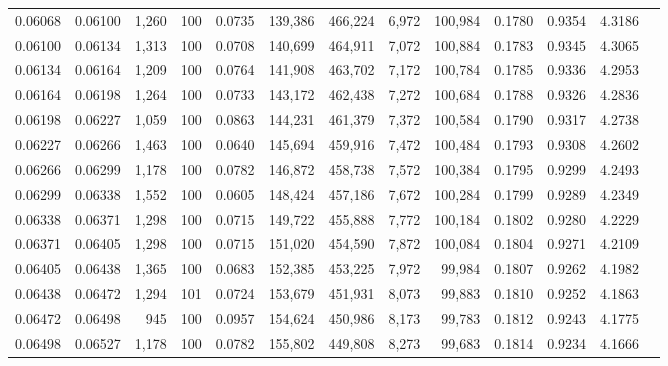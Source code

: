 \begin{tabular}{rrrrrrrrrrrrr}
0.06068 & 0.06100 & 1,260 & 100 &                                     0.0735 & 139,386 & 466,224 &   6,972 & 100,984 & 0.1780 & 0.9354 & 4.3186 \\
0.06100 & 0.06134 & 1,313 & 100 &                                     0.0708 & 140,699 & 464,911 &   7,072 & 100,884 & 0.1783 & 0.9345 & 4.3065 \\
0.06134 & 0.06164 & 1,209 & 100 &                                     0.0764 & 141,908 & 463,702 &   7,172 & 100,784 & 0.1785 & 0.9336 & 4.2953 \\
0.06164 & 0.06198 & 1,264 & 100 &                                     0.0733 & 143,172 & 462,438 &   7,272 & 100,684 & 0.1788 & 0.9326 & 4.2836 \\
0.06198 & 0.06227 & 1,059 & 100 &                                     0.0863 & 144,231 & 461,379 &   7,372 & 100,584 & 0.1790 & 0.9317 & 4.2738 \\
0.06227 & 0.06266 & 1,463 & 100 &                                     0.0640 & 145,694 & 459,916 &   7,472 & 100,484 & 0.1793 & 0.9308 & 4.2602 \\
0.06266 & 0.06299 & 1,178 & 100 &                                     0.0782 & 146,872 & 458,738 &   7,572 & 100,384 & 0.1795 & 0.9299 & 4.2493 \\
0.06299 & 0.06338 & 1,552 & 100 &                                     0.0605 & 148,424 & 457,186 &   7,672 & 100,284 & 0.1799 & 0.9289 & 4.2349 \\
0.06338 & 0.06371 & 1,298 & 100 &                                     0.0715 & 149,722 & 455,888 &   7,772 & 100,184 & 0.1802 & 0.9280 & 4.2229 \\
0.06371 & 0.06405 & 1,298 & 100 &                                     0.0715 & 151,020 & 454,590 &   7,872 & 100,084 & 0.1804 & 0.9271 & 4.2109 \\
0.06405 & 0.06438 & 1,365 & 100 &                                     0.0683 & 152,385 & 453,225 &   7,972 &  99,984 & 0.1807 & 0.9262 & 4.1982 \\
0.06438 & 0.06472 & 1,294 & 101 &                                     0.0724 & 153,679 & 451,931 &   8,073 &  99,883 & 0.1810 & 0.9252 & 4.1863 \\
0.06472 & 0.06498 &   945 & 100 &                                     0.0957 & 154,624 & 450,986 &   8,173 &  99,783 & 0.1812 & 0.9243 & 4.1775 \\
0.06498 & 0.06527 & 1,178 & 100 &                                     0.0782 & 155,802 & 449,808 &   8,273 &  99,683 & 0.1814 & 0.9234 & 4.1666 \\

\end{tabular}
